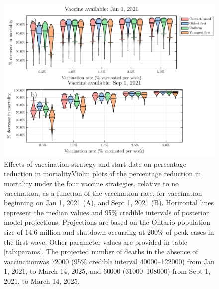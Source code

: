\begin{figure}
  \includegraphics[width=\textwidth]{chapter_3/vaccination_by_mortality_small.pdf}  
  \caption{Effects of vaccination strategy and start date on percentage reduction in mortalityViolin plots of the percentage reduction in mortality under the four vaccine strategies, relative to no vaccination, as a function of the vaccination rate, for vaccination beginning on Jan 1, 2021 (A), and Sept 1, 2021 (B). Horizontal lines represent the median values and 95\% credible intervals of posterior model projections. Projections are based on the Ontario population size of 14.6 million and shutdown occurring at 200\% of peak cases in the first wave. Other parameter values are provided in table \ref{tab:params}. The projected number of deaths in the absence of vaccinationwas 72000 (95\% credible interval 40000–122000) from Jan 1, 2021, to March 14, 2025, and 60000 (31000–108000) from Sept 1, 2021, to March 14, 2025.}
  \label{fig4}
\end{figure}
